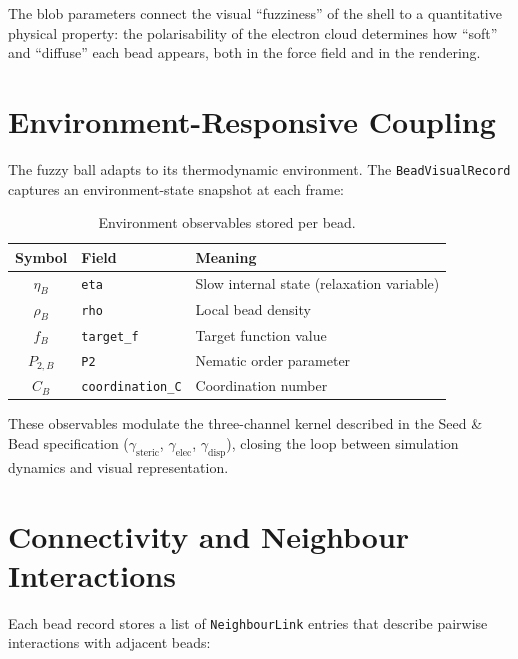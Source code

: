 \documentclass[12pt, a4paper, oneside]{article}
\newcommand{\type}[1]{\texttt{#1}}
\newcommand{\field}[1]{\texttt{#1}}
\begin{document}
The blob parameters connect the visual ``fuzziness'' of the shell to
a quantitative physical property: the polarisability of the electron
cloud determines how ``soft'' and ``diffuse'' each bead appears, both
in the force field and in the rendering.

\section{Environment-Responsive Coupling}

The fuzzy ball adapts to its thermodynamic environment.  The
\type{BeadVisualRecord} captures an environment-state snapshot at each
frame:

\begin{table}[htbp]
  \centering
  \caption{Environment observables stored per bead.}
  \label{tab:env}
  \begin{tabular}{clp{7cm}}
    \toprule
    Symbol & Field & Meaning \\
    \midrule
    $\eta_B$ & \field{eta} & Slow internal state (relaxation variable) \\
    $\rho_B$ & \field{rho} & Local bead density \\
    $f_B$    & \field{target\_f} & Target function value \\
    $P_{2,B}$& \field{P2}  & Nematic order parameter \\
    $C_B$    & \field{coordination\_C} & Coordination number \\
    \bottomrule
  \end{tabular}
\end{table}

These observables modulate the three-channel kernel described in
the Seed \& Bead specification
($\gamma_{\text{steric}}$, $\gamma_{\text{elec}}$,
$\gamma_{\text{disp}}$), closing the loop between simulation dynamics
and visual representation.

\section{Connectivity and Neighbour Interactions}

Each bead record stores a list of \type{NeighbourLink} entries that
describe pairwise interactions with adjacent beads:
\end{document}
